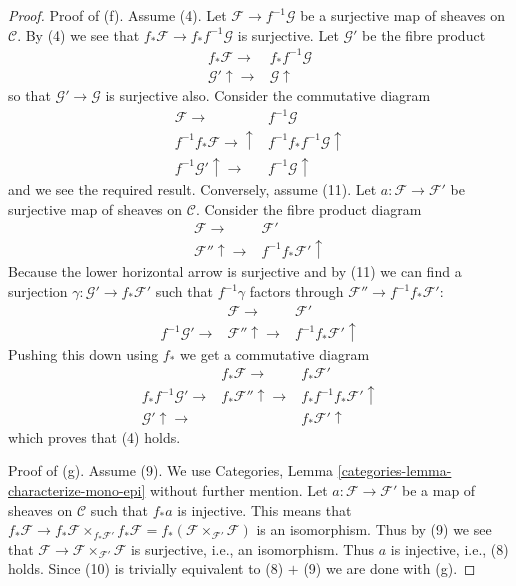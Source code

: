 \begin{proof}
\medskip\noindent
Proof of (f). Assume (4). Let $\mathcal{F} \to f^{-1}\mathcal{G}$ be
a surjective map of sheaves on $\mathcal{C}$. By (4) we see that
$f_*\mathcal{F} \to f_*f^{-1}\mathcal{G}$ is surjective. Let
$\mathcal{G}'$ be the fibre product
$$
\begin{array}{cc}f_*\mathcal{F} \longrightarrow & f_*f^{-1}\mathcal{G} \\ \mathcal{G}' \uparrow\longrightarrow & \mathcal{G} \uparrow\end{array}
$$
so that $\mathcal{G}' \to \mathcal{G}$ is surjective also. Consider
the commutative diagram
$$
\begin{array}{cc}\mathcal{F} \longrightarrow & f^{-1}\mathcal{G} \\ f^{-1}f_*\mathcal{F} \longrightarrow\uparrow & f^{-1}f_*f^{-1}\mathcal{G} \uparrow \\ f^{-1}\mathcal{G}' \uparrow\longrightarrow & f^{-1}\mathcal{G} \uparrow\end{array}
$$
and we see the required result. Conversely, assume (11).
Let $a : \mathcal{F} \to \mathcal{F}'$ be surjective map of sheaves
on $\mathcal{C}$. Consider the fibre product diagram
$$
\begin{array}{cc}\mathcal{F} \longrightarrow & \mathcal{F}' \\ \mathcal{F}'' \uparrow\longrightarrow & f^{-1}f_*\mathcal{F}' \uparrow\end{array}
$$
Because the lower horizontal arrow is surjective and by (11) we can
find a surjection $\gamma : \mathcal{G}' \to f_*\mathcal{F}'$ such
that $f^{-1}\gamma$ factors through $\mathcal{F}'' \to f^{-1}f_*\mathcal{F}'$:
$$
\begin{array}{ccc} & \mathcal{F} \longrightarrow & \mathcal{F}' \\ f^{-1}\mathcal{G}' \longrightarrow & \mathcal{F}'' \uparrow\longrightarrow & f^{-1}f_*\mathcal{F}' \uparrow\end{array}
$$
Pushing this down using $f_*$ we get a commutative diagram
$$
\begin{array}{ccc} & f_*\mathcal{F} \longrightarrow & f_*\mathcal{F}' \\ f_*f^{-1}\mathcal{G}' \longrightarrow & f_*\mathcal{F}'' \uparrow\longrightarrow & f_*f^{-1}f_*\mathcal{F}' \uparrow \\ \mathcal{G}' \uparrow\longrightarrow &  & f_*\mathcal{F}' \uparrow\end{array}
$$
which proves that (4) holds.

\medskip\noindent
Proof of (g). Assume (9). We use
Categories, Lemma \ref{categories-lemma-characterize-mono-epi}
without further mention. Let $a : \mathcal{F} \to \mathcal{F}'$ be a map
of sheaves on $\mathcal{C}$ such that $f_*a$ is injective. This means that
$f_*\mathcal{F} \to f_*\mathcal{F} \times_{f_*\mathcal{F}'} f_*\mathcal{F} =
f_*(\mathcal{F} \times_{\mathcal{F}'} \mathcal{F})$ is an isomorphism.
Thus by (9) we see that
$\mathcal{F} \to \mathcal{F} \times_{\mathcal{F}'} \mathcal{F}$ is
surjective, i.e., an isomorphism. Thus $a$ is injective, i.e., (8) holds.
Since (10) is trivially equivalent to (8) $+$ (9) we are done with (g).


\end{proof}
